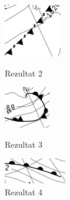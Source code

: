 \documentclass{article}
\begin{document}
\begin{figure}[!htb]
   \begin{minipage}{0.30\textwidth}
     \centering
     \includegraphics[width=.7\linewidth]{result2.jpg}
     \caption{Rezultat 2}\label{Fig:Rez2}
   \end{minipage}\hfill
   \begin{minipage}{0.30\textwidth}
     \centering
     \includegraphics[width=.7\linewidth]{result3.jpg}
     \caption{Rezultat 3}\label{Fig:Rez3}
   \end{minipage}
   \begin{minipage}{0.30\textwidth}
     \centering
     \includegraphics[width=.7\linewidth]{result4.jpg}
     \caption{Rezultat 4}\label{Fig:Rez4}
   \end{minipage}
\end{figure}
\end{document}
